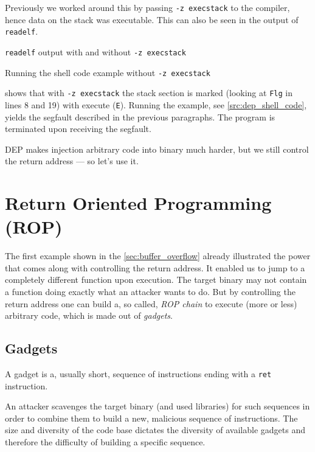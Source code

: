 \documentclass[article]{uibk}
\begin{document}
Previously we worked around this by passing \texttt{-z execstack} to the
compiler, hence data on the stack was executable. This can also be seen in the
output of \texttt{readelf}.

\begin{listing}[h!]
    \caption{\texttt{readelf} output with and without \texttt{-z execstack}}
    \label{src:dep_readelf}
\end{listing}

\begin{listing}[h!]
    \caption{Running the shell code example without \texttt{-z execstack}}
    \label{src:dep_shell_code}
\end{listing}

 shows that with \texttt{-z execstack} the stack section
is marked (looking at \texttt{Flg} in lines 8 and 19) with execute
(\texttt{E}). Running the example, see \cref{src:dep_shell_code}, yields the
segfault described in the previous paragraphs. The program is terminated upon
receiving the segfault.

DEP makes injection arbitrary code into binary much harder, but we still
control the return address --- so let's use it.

\section{Return Oriented Programming (ROP)}

The first example shown in the \cref{sec:buffer_overflow} already illustrated
the power that comes along with controlling the return address. It enabled us
to jump to a completely different function upon execution. The target binary
may not contain a function doing exactly what an attacker wants to do. But by
controlling the return address one can build a, so called, \textit{ROP chain}
to execute (more or less) arbitrary code, which is made out of
\textit{gadgets}.~\cite{wiki:rop,buchanan2008good,shacham2007}

\subsection{Gadgets}

A gadget is a, usually short, sequence of instructions ending with a
\texttt{ret} instruction.

An attacker scavenges the target binary (and used libraries) for such sequences
in order to combine them to build a new, malicious sequence of instructions.
The size and diversity of the code base dictates the diversity of available
gadgets and therefore the difficulty of building a specific sequence.
\end{document}
